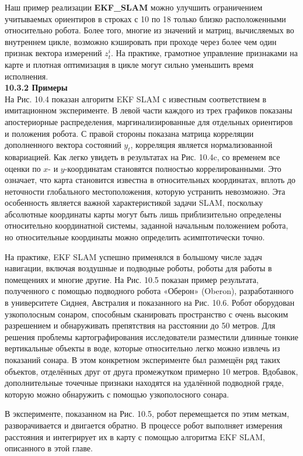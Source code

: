 \documentclass[10pt,a4paper]{article}
\begin{document}
Наш пример реализации \textbf{EKF\_SLAM} можно улучшить ограничением учитываемых ориентиров в строках с 10 по 18 только близко расположенными относительно робота. Более того, многие из значений и матриц, вычисляемых во внутреннем цикле, возможно кэшировать при проходе через более чем один признак вектора измерений $z_t^i$. На практике, грамотное управление признаками на карте и плотная оптимизация в цикле могут сильно уменьшить время исполнения.\\

\textbf{10.3.2	Примеры}\\

На Рис. 10.4 показан алгоритм EKF SLAM с известным соответствием в имитационном эксперименте. В левой части каждого из трех графиков показаны апостериорные распределения, маргинализированные для отдельных ориентиров и положения робота. С правой стороны показана матрица корреляции дополненного вектора состояний $y_t$, корреляция является нормализованной ковариацией.  Как легко увидеть в результатах на Рис. 10.4c, со временем все оценки по $x$- и $y$-координатам становятся полностью коррелированными. Это означает, что карта становится известна в относительных координатах, вплоть до неточности глобального местоположения, которую устранить невозможно. Эта особенность является важной характеристикой задачи SLAM, поскольку абсолютные координаты карты могут быть лишь приблизительно определены относительно координатной системы, заданной начальным положением робота, но относительные координаты можно определить асимптотически точно.

На практике, EKF SLAM успешно применялся в большому числе задач навигации, включая воздушные и подводные роботы, роботы для работы в помещениях и многие другие. На Рис. 10.5 показан пример результата, полученного с помощью подводного робота «Оберон» (Oberon), разработанного в университете Сиднея, Австралия и показанного на Рис. 10.6. Робот оборудован узкополосным сонаром, способным сканировать пространство с очень высоким разрешением и обнаруживать препятствия на расстоянии до 50 метров. Для решения проблемы картографирования исследователи разместили длинные тонкие вертикальные объекты в воде, которые относительно легко можно извлечь из показаний сонара. В этом конкретном эксперименте был размещён ряд таких объектов, отделённых друг от друга промежутком примерно 10 метров. Вдобавок, дополнительные точечные признаки находятся на удалённой подводной гряде, которую можно обнаружить с помощью узкополосного сонара.

В эксперименте, показанном на Рис. 10.5, робот перемещается по этим меткам, разворачивается и двигается обратно. В процессе робот выполняет измерения расстояния и интегрирует их в карту с помощью алгоритма EKF SLAM, описанного в этой главе. 
\end{document}
